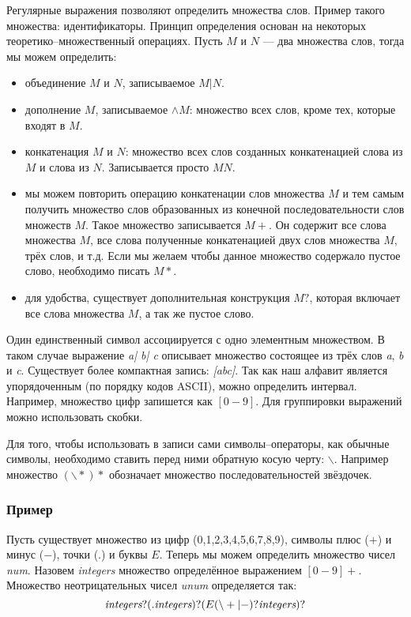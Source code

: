 Регулярные выражения позволяют определить множества слов. Пример такого
множества: идентификаторы. Принцип определения основан на некоторых
теоретико–множественный операциях. Пусть $M$ и $N$ --- два множества слов, тогда
мы можем определить:

\begin{itemize}
	\item объединение $M$ и $N$, записываемое $M | N$.

	\item дополнение $M$, записываемое $\wedge M$: множество всех слов, кроме
тех, которые входят в $M$.

	\item конкатенация $M$ и $N$: множество всех слов созданных конкатенацией
слова из $M$ и слова из $N$. Записывается просто $MN$.

	\item мы можем повторить операцию конкатенации слов множества $M$ и тем
самым получить множество слов образованных из конечной последовательности слов
множеств $M$. Такое множество записывается $M+$. Он содержит все слова множества
$M$, все слова полученные конкатенацией двух слов множества $M$, трёх слов, и
т.д. Если мы желаем чтобы данное множество содержало пустое слово, необходимо
писать $M*$.

	\item для удобства, существует дополнительная конструкция $M?$, которая
включает все слова множества $M$, а так же пустое слово.
\end{itemize}

Один единственный символ ассоциируется с одно элементным множеством. В таком
случае выражение {\it a| b| c} описывает множество состоящее из трёх слов
{\it a}, {\it b} и {\it c}. Существует более компактная запись: {\it [abc]}.
Так как наш алфавит является упорядоченным (по порядку кодов ASCII), можно
определить интервал. Например, множество цифр запишется как $[0-9]$. Для
группировки выражений можно использовать скобки.

Для того, чтобы использовать в записи сами символы–операторы, как обычные
символы, необходимо ставить перед ними обратную косую черту: $\backslash$.
Например множество $(\backslash *)*$ обозначает множество последовательностей
звёздочек.

\subsubsection{Пример}

Пусть существует множество из цифр (0,1,2,3,4,5,6,7,8,9), символы плюс ($+$) и
минус ($-$), точки ($.$) и буквы $E$. Теперь мы можем определить множество чисел
{\it num}. Назовем {\it integers} множество определённое выражением $[0-9]+$.
Множество неотрицательных чисел {\it unum} определяется так:
$$
	\text{\it integers} ? (.\text{\it integers}) ? (E(\backslash+|-) ? \\
\text{\it integers})?
$$

